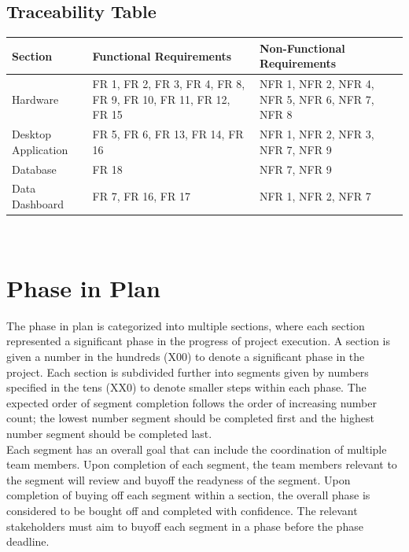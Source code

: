 \documentclass[12pt]{article}
\begin{document}
\subsection{Traceability Table}

  \begin{tabular}{| p{} | p{}| p{}|}
    \hline
    \rowcolor[gray]{0.9}
    Section & Functional Requirements & Non-Functional Requirements\\
    \hline
    Hardware & FR 1, FR 2, FR 3, FR 4, FR 8, FR 9, FR 10, FR 11, FR 12, FR 15 & NFR 1, NFR 2, NFR 4, NFR  5, NFR 6, NFR 7, NFR 8 \\
    \hline
    Desktop Application & FR 5, FR 6, FR 13, FR 14, FR 16 & NFR 1, NFR 2, NFR 3, NFR 7, NFR 9\\
    \hline
    Database & FR 18 & NFR 7, NFR 9\\
    \hline
    Data Dashboard & FR 7, FR 16, FR 17 & NFR 1, NFR 2, NFR 7\\
    \hline
  \end{tabular}
\\


\section{Phase in Plan}

The phase in plan is categorized into multiple sections, where each section represented a significant phase in the progress of project execution. A section is given a number in the hundreds (X00) to denote a significant phase in the project. Each section is subdivided further into segments given by numbers specified in the tens (XX0) to denote smaller steps within each phase. The expected order of segment completion follows the order of increasing number count; the lowest number segment should be completed first and the highest number segment should be completed last.\\

Each segment has an overall goal that can include the coordination of multiple team members. Upon completion of each segment, the team members relevant to the segment will review and buyoff the readyness of the segment. Upon completion of buying off each segment within a section, the overall phase is considered to be bought off and completed with confidence. The relevant stakeholders must aim to buyoff each segment in a phase before the phase deadline.\\
\end{document}

